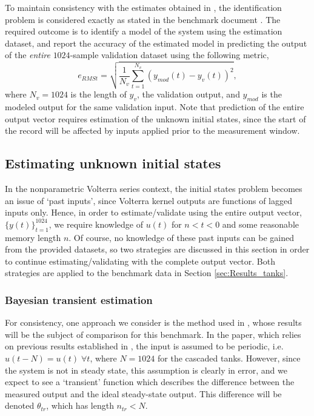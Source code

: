 To maintain consistency with the estimates obtained in \cite{Birpoutsoukis2017b}, the identification problem is considered exactly as stated in the benchmark document \cite{Schoukens2016c}. The required outcome is to identify a model of the system using the estimation dataset, and report the accuracy of the estimated model in predicting the output of the \emph{entire} $1024$-sample validation dataset using the following metric, 
\begin{equation}
e_{RMSt} = \sqrt{\frac{1}{N_v} \sum_{t=1}^{N_v} (y_{mod}(t) - y_v(t) )^2},
\label{eq:e_RMSt}
\end{equation}
where $N_v = 1024$ is the length of $y_v$, the validation output, and $y_{mod}$ is the modeled output for the same validation input. Note that prediction of the entire output vector requires estimation of the unknown initial states, since the start of the record will be affected by inputs applied prior to the measurement window. 

\subsection{Estimating unknown initial states}

In the nonparametric Volterra series context, the initial states problem becomes an issue of `past inputs', since Volterra kernel outputs are functions of lagged inputs only. Hence, in order to estimate/validate using the entire output vector, $\{y(t)\}_{t=1}^{1024}$, we require knowledge of $u(t)$ for $n<t<0$ and some reasonable memory length $n$. Of course, no knowledge of these past inputs can be gained from the provided datasets, so two strategies are discussed in this section in order to continue estimating/validating with the complete output vector. Both strategies are applied to the benchmark data in Section \ref{sec:Results_tanks}.

\subsubsection{Bayesian transient estimation}
\label{sec:BayesTrans_tanks}

For consistency, one approach we consider is the method used in \cite{Birpoutsoukis2017b}, whose results will be the subject of comparison for this benchmark. In the paper, which relies on previous results established in \cite{Csurcsia2015}, the input is assumed to be periodic, i.e. $u(t-N) = u(t) \; \forall t$, where $N=1024$ for the cascaded tanks. However, since the system is not in steady state, this assumption is clearly in error, and we expect to see a `transient' function which describes the difference between the measured output and the ideal steady-state output. This difference will be denoted $\theta_{tr}$, which has length $n_{tr}<N$.

